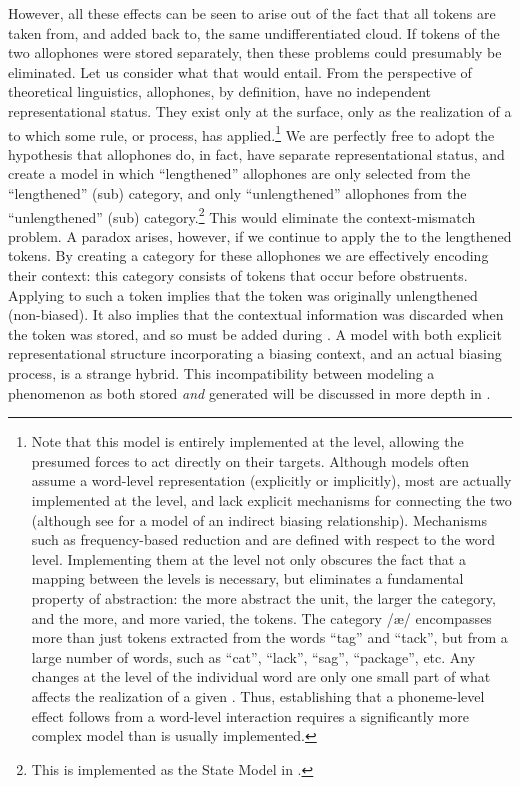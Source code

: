 However, all these effects can be seen to arise out of the fact that
all tokens are taken from, and added back to, the same undifferentiated
cloud. If tokens of the two allophones were stored separately, then
these problems could presumably be eliminated. Let us consider what
that would entail. From the perspective of theoretical linguistics,
allophones, by definition, have no independent representational status.
They exist only at the surface, only as the realization of a 
to which some rule, or process, has applied.\footnote{Note that this model is entirely implemented at the  level,
allowing the presumed forces to act directly on their targets. Although
 models often assume a word-level representation (explicitly
or implicitly), most are actually implemented at the  level,
and lack explicit mechanisms for connecting the two (although see
\citet{Wedel2008} for a model of an indirect biasing relationship).
Mechanisms such as frequency-based reduction and 
are defined with respect to the word level. Implementing them at the
 level not only obscures the fact that a mapping between
the levels is necessary, but eliminates a fundamental property of
abstraction: the more abstract the unit, the larger the category,
and the more, and more varied, the tokens. The  category {/æ/}
encompasses more than just tokens extracted from the words “tag”
and “tack”, but from a large number of words, such as “cat”,
“lack”, “sag”, “package”, etc. Any changes at the
level of the individual word are only one small part of what affects
the realization of a given . Thus, establishing that a phoneme-level
effect follows from a word-level interaction requires a significantly
more complex model than is usually implemented. } We are perfectly free to adopt the hypothesis that allophones do,
in fact, have separate representational status, and create a model
in which “lengthened” allophones are only selected from the
“lengthened” (sub) category, and only “unlengthened” allophones
from the “unlengthened” (sub) category.\footnote{This is implemented as the State Model in .}
This would eliminate the context-mismatch problem. A paradox arises,
however, if we continue to apply the   to the lengthened
tokens. By creating a category for these allophones we are effectively
encoding their context: this category consists of tokens that occur
before  obstruents. Applying  to such a token implies
that the token was originally unlengthened (non-biased). It also implies
that the contextual information was discarded when the token was stored,
and so must be added during . A model with both explicit
representational structure incorporating a biasing context, and an
actual biasing process, is a strange hybrid. This incompatibility
between modeling a phenomenon as both stored \emph{and} generated
will be discussed in more depth in . 

